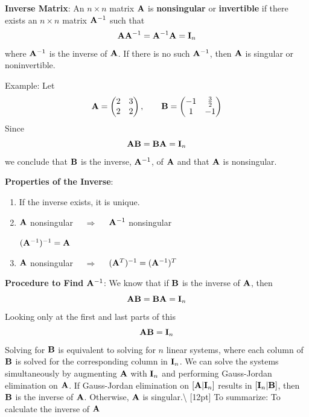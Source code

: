 \documentclass[]{book}
\theoremstyle{definition}
\theoremstyle{definition}
\theoremstyle{definition}
\theoremstyle{remark}
\begin{document}
\textbf{Inverse Matrix}: An \(n\times n\) matrix \({\bf A}\) is
\textbf{nonsingular} or \textbf{invertible} if there exists an
\(n\times n\) matrix \({\bf A}^{-1}\) such that
\[{\bf A} {\bf A}^{-1} = {\bf A}^{-1} {\bf A} = {\bf I}_n\] where
\({\bf A}^{-1}\) is the inverse of \({\bf A}\). If there is no such
\({\bf A}^{-1}\), then \({\bf A}\) is singular or noninvertible.

Example: Let
\[{\bf A} = \begin{pmatrix} 2&3\\2&2 \end{pmatrix}, \qquad {\bf B}=\begin{pmatrix} -1&\frac{3}{2}\\ 1&-1
        \end{pmatrix}\] Since
\[{\bf A} {\bf B} = {\bf B} {\bf A} = {\bf I}_n\] we conclude that
\({\bf B}\) is the inverse, \({\bf A}^{-1}\), of \({\bf A}\) and that
\({\bf A}\) is nonsingular.

\textbf{Properties of the Inverse}:

\begin{enumerate}
\item If the inverse exists, it is unique.
\item \parbox[t]{4in}{${\bf A}$ nonsingular $\quad \Longrightarrow \quad $ ${\bf A}^{-1}$ nonsingular} $({\bf A}^{-1})^{-1} = {\bf A}$
\item ${\bf A}$ nonsingular $\quad \Longrightarrow\quad$ $({\bf A}^T)^{-1}=({\bf A}^{-1})^T$
    \end{enumerate}

\textbf{Procedure to Find ${\bf A}^{-1}$}: We know that if \({\bf B}\)
is the inverse of \({\bf A}\), then
\[{\bf A} {\bf B} = {\bf B} {\bf A} = {\bf I}_n\] Looking only at the
first and last parts of this \[{\bf A} {\bf B} = {\bf I}_n\] Solving for
\({\bf B}\) is equivalent to solving for \(n\) linear systems, where
each column of \({\bf B}\) is solved for the corresponding column in
\({\bf I}_n\). We can solve the systems simultaneously by augmenting
\({\bf A}\) with \({\bf I}_n\) and performing Gauss-Jordan elimination
on \({\bf A}\). If Gauss-Jordan elimination on \([{\bf A} | {\bf I}_n]\)
results in \([{\bf I}_n | {\bf B} ]\), then \({\bf B}\) is the inverse
of \({\bf A}\). Otherwise, \({\bf A}\) is singular.\textbackslash{}
{[}12pt{]} To summarize: To calculate the inverse of \({\bf A}\)
\end{document}
